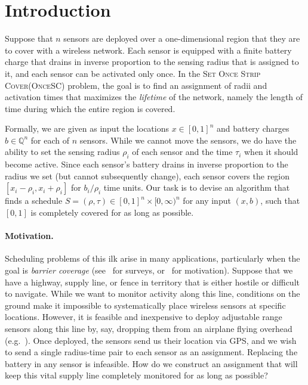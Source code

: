 \documentclass[11pt]{article}
\newcommand{\sosc}{\textsc{OnceSC}\xspace}
\newcommand{\sosclong}{\textsc{Set Once Strip Cover}\xspace}
\begin{document}
\section{Introduction}

Suppose that $n$ sensors are deployed over a one-dimensional
region that they are to cover with a wireless network. Each sensor is
equipped with a finite battery charge that drains in inverse
proportion to the sensing radius that is assigned to it, and each
sensor can be activated only once.  In the \sosclong (\sosc) problem,
the goal is to find an assignment of radii and activation times that
maximizes the \emph{lifetime} of the network, namely the length of
time during which the entire region is covered.

Formally, we are given as input the locations $x \in [0,1]^n$ and
battery charges $b \in \mathbb{Q}^n$ for each of $n$ sensors. While we
cannot move the sensors, we do have the ability to set the sensing
radius $\rho_i$ of each sensor and the time $\tau_i$ when it should
become active.  Since each sensor's battery drains in inverse
proportion to the radius we set (but cannot subsequently change), each
sensor covers the region $[x_i - \rho_i, x_i + \rho_i]$ for
$b_i/\rho_i$ time units.  Our task is to devise an algorithm that
finds a schedule $S = (\rho, \tau) \in [0,1]^n \times [0,\infty)^n$
for any input $(x,b)$, such that $[0,1]$ is completely covered for as
long as possible.




\paragraph*{\bf Motivation.}
Scheduling problems of this ilk arise in many applications,
particularly when the goal is \emph{barrier coverage}
(see~\cite{cardei2004coverage,wang2006survey} for surveys,
or~\cite{kumar2007barrier} for motivation).  Suppose that we have a
highway, supply line, or fence in territory that is either hostile or
difficult to navigate.  While we want to monitor activity along this
line, conditions on the ground make it impossible to systematically
place wireless sensors at specific locations.  However, it is feasible
and inexpensive to deploy adjustable range sensors along this line by,
say, dropping them from an airplane flying overhead
(e.g.~\cite{cardei2005improving,saipulla2009barrier,taniguchi2011uniform}).
Once deployed, the sensors send us their location via GPS, and we wish
to send a single radius-time pair to each sensor as an assignment.
Replacing the battery in any sensor is infeasible. How do we construct
an assignment that will keep this vital supply line completely
monitored for as long as possible?
\end{document}
